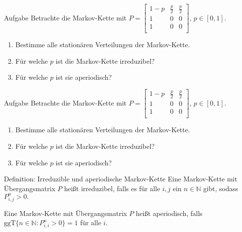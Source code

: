 \documentclass[t,11pt]{beamer}
\begin{document}
\begin{frame}
	\begin{block}{Aufgabe}
		Betrachte die Markov-Kette mit $P=\begin{bmatrix}
		1-p & \frac{p}{2} & \frac{p}{2} \\
		1 & 0 & 0 \\
		1 & 0 & 0 \\
		\end{bmatrix}$, $p\in[0,1]$.
		\begin{enumerate}
			\item Bestimme alle stationären Verteilungen der Markov-Kette.
			\item Für welche $p$ ist die Markov-Kette irreduzibel? 
			\item Für welche $p$ ist sie aperiodisch?
		\end{enumerate}
	\end{block}
\end{frame}

\begin{frame}
\begin{block}{Aufgabe}
	Betrachte die Markov-Kette mit $P=\begin{bmatrix}
	1-p & \frac{p}{2} & \frac{p}{2} \\
	1 & 0 & 0 \\
	1 & 0 & 0 \\
	\end{bmatrix}$, $p\in[0,1]$.
	\begin{enumerate}
		\item Bestimme alle stationären Verteilungen der Markov-Kette.
		\item Für welche $p$ ist die Markov-Kette irreduzibel? 
		\item Für welche $p$ ist sie aperiodisch?
	\end{enumerate}
\end{block}
\begin{alertblock}{Definition: Irreduzible und aperiodische Markov-Kette}
	Eine Markov-Kette mit Übergangsmatrix $P$ heißt irreduzibel, falls es für alle $i,j$ ein $n\in\mathbb{N}$ gibt, sodass $P_{i,j}^n>0.$
	
	Eine Markov-Kette mit Übergangsmatrix $P$ heißt aperiodisch, falls $\text{ggT}\{n\in\mathbb{N}:P^n_{i,i}>0\}=1$ für alle $i$.
\end{alertblock}
\end{frame}
\end{document}
